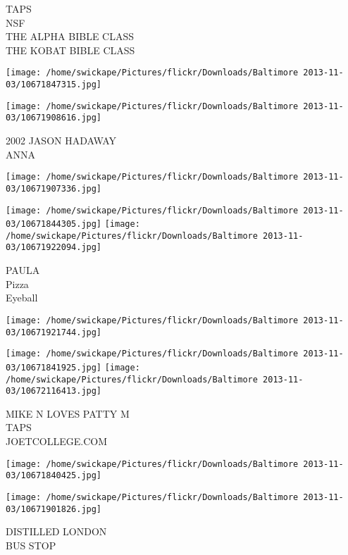 \documentclass[10pt,letterpaper]{article}
\begin{document}
TAPS\\
NSF\\
THE ALPHA BIBLE CLASS\\
THE KOBAT BIBLE CLASS\\
\pagebreak

\texttt{[image: /home/swickape/Pictures/flickr/Downloads/Baltimore 2013-11-03/10671847315.jpg]}

\vspace{0.25in}
\texttt{[image: /home/swickape/Pictures/flickr/Downloads/Baltimore 2013-11-03/10671908616.jpg]}

2002 JASON HADAWAY\\
ANNA\\
\pagebreak

\texttt{[image: /home/swickape/Pictures/flickr/Downloads/Baltimore 2013-11-03/10671907336.jpg]}

\vspace{0.25in}
\texttt{[image: /home/swickape/Pictures/flickr/Downloads/Baltimore 2013-11-03/10671844305.jpg]}
\texttt{[image: /home/swickape/Pictures/flickr/Downloads/Baltimore 2013-11-03/10671922094.jpg]}

PAULA\\
Pizza\\
Eyeball\\
\pagebreak

\texttt{[image: /home/swickape/Pictures/flickr/Downloads/Baltimore 2013-11-03/10671921744.jpg]}

\vspace{0.25in}
\texttt{[image: /home/swickape/Pictures/flickr/Downloads/Baltimore 2013-11-03/10671841925.jpg]}
\texttt{[image: /home/swickape/Pictures/flickr/Downloads/Baltimore 2013-11-03/10672116413.jpg]}

MIKE N LOVES PATTY M\\
TAPS\\
JOETCOLLEGE.COM\\
\pagebreak

\texttt{[image: /home/swickape/Pictures/flickr/Downloads/Baltimore 2013-11-03/10671840425.jpg]}

\vspace{0.25in}
\texttt{[image: /home/swickape/Pictures/flickr/Downloads/Baltimore 2013-11-03/10671901826.jpg]}

DISTILLED LONDON\\
BUS STOP\\
\pagebreak
\end{document}
